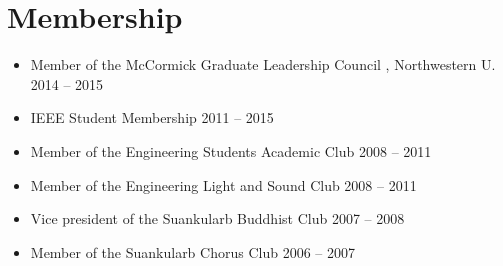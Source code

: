 \section{\sc Membership}

\begin{itemize}[leftmargin=0cm, label={}]

\item Member of the McCormick Graduate Leadership Council	, Northwestern U.	\hfill 2014 -- 2015
\item IEEE Student Membership \hfill 2011 -- 2015
\item Member of the Engineering Students Academic Club \hfill 2008 -- 2011
\item Member of the Engineering Light and Sound Club \hfill 2008 -- 2011
\item Vice president of the Suankularb Buddhist Club \hfill 2007 -- 2008
\item Member of the Suankularb Chorus Club \hfill 2006 -- 2007

\end{itemize}
